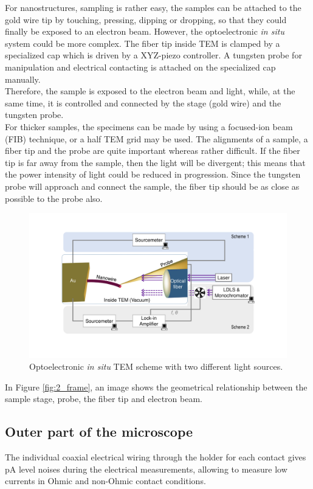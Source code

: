 For nanostructures, sampling is rather easy, the samples can be attached to the gold wire tip by touching, pressing, dipping or dropping, so that they could finally be exposed to an electron beam.
However, the optoelectronic {\em in situ} system could be more complex. The fiber tip inside TEM is clamped by a specialized cap which is driven by a XYZ-piezo controller. A tungsten probe for manipulation and electrical contacting is attached on the specialized cap manually. \\
Therefore, the sample is exposed to the electron beam and light, while, at the same time, it is controlled and connected by the stage (gold wire) and the tungsten probe. \\

For thicker samples, the specimens can be made by using a focused-ion beam (FIB) technique, or a half TEM grid may be used. 
The alignments of a sample, a fiber tip and the probe are quite important whereas rather difficult. If the fiber tip is far away from the sample, then the light will be divergent; this means that the power intensity of light could be reduced in progression. Since the tungsten probe will approach and connect the sample, the fiber tip should be as close as possible to the probe also. 

\begin{figure}
\centering
\includegraphics[width=\textwidth]{figures/figure6_1}
\caption[Optoelectronic {\em in situ} TEM scheme]{Optoelectronic {\it in situ} TEM scheme with two different light sources. }
\label{fig:6_1}
\end{figure}

In Figure \ref{fig:2_frame}, an image shows the geometrical relationship between the sample stage, probe, the fiber tip and electron beam. 

\subsection{Outer part of the microscope}
The individual coaxial electrical wiring through the holder for each contact gives pA level noises during the electrical measurements, allowing to measure low currents in Ohmic and non-Ohmic contact conditions. 

